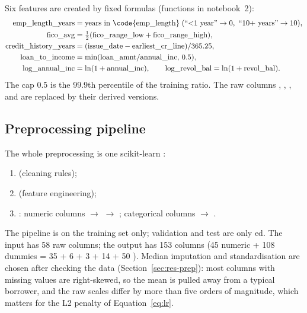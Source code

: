 Six features are created by fixed formulas (functions  in notebook~2):
\begin{align*}
\text{emp\_length\_years}&=\text{years in \code{emp\_length}} \;(\text{``<1 year''}\to 0,\ \text{``10+ years''}\to 10),\\
\text{fico\_avg}&=\tfrac12(\text{fico\_range\_low}+\text{fico\_range\_high}),\\
\text{credit\_history\_years}&=(\text{issue\_date}-\text{earliest\_cr\_line})/365.25,\\
\text{loan\_to\_income}&=\min(\text{loan\_amnt}/\text{annual\_inc},\,0.5),\\
\text{log\_annual\_inc}&=\ln(1+\text{annual\_inc}),\qquad \text{log\_revol\_bal}=\ln(1+\text{revol\_bal}).
\end{align*}
The cap 0.5 is the 99.9th percentile of the training ratio. The raw columns , , ,  and  are replaced by their derived versions.

\subsection{Preprocessing pipeline}
\label{sec:pipeline}

The whole preprocessing is one scikit-learn :
\begin{enumerate}
    \item {} (cleaning rules);
    \item {} (feature engineering);
    \item {}: numeric columns $\to$  $\to$ ; categorical columns $\to$ .
\end{enumerate}
The pipeline is  on the training set only; validation and test are only ed. The input has 58 raw columns; the output has 153 columns (45 numeric + 108 dummies = 35  + 6  + 3  + 14  + 50 ). Median imputation and standardisation are chosen after checking the data (Section~\ref{sec:res-prep}): most columns with missing values are right-skewed, so the mean is pulled away from a typical borrower, and the raw scales differ by more than five orders of magnitude, which matters for the L2 penalty of Equation~\eqref{eq:lr}.

